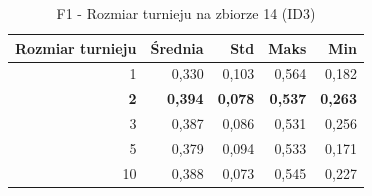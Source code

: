 \begin{table}[htbp]
\centering
\small
\setlength{\tabcolsep}{6pt}
\renewcommand{\arraystretch}{1.2}
\caption{F1 - Rozmiar turnieju na zbiorze 14 (ID3)}
\label{tab:ID3_tournament_size_14_f1}
\begin{tabular}{r|r|r|r|r}
\toprule
Rozmiar turnieju & Średnia & Std & Maks & Min \\
\hline
1 & 0,330 & 0,103 & 0,564 & 0,182 \\
\textbf{2} & \textbf{0,394} & \textbf{0,078} & \textbf{0,537} & \textbf{0,263} \\
3 & 0,387 & 0,086 & 0,531 & 0,256 \\
5 & 0,379 & 0,094 & 0,533 & 0,171 \\
10 & 0,388 & 0,073 & 0,545 & 0,227 \\
\bottomrule
\end{tabular}
\end{table}